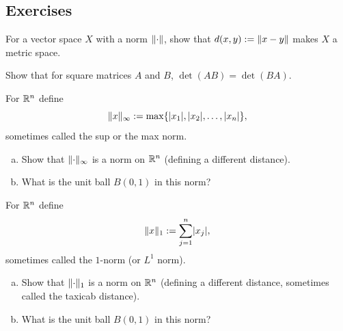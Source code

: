 \subsection{Exercises}

\begin{exercise}
For a vector space $X$ with a norm $\lVert {\cdot} \rVert$, show that
$d(x,y) := \lVert {x-y} \rVert$ makes $X$ a metric space.
\end{exercise}

\begin{exercise}[Easy]
Show that for square matrices $A$ and $B$, $\det(AB) = \det(BA)$.
\end{exercise}

\begin{exercise}
For ${\mathbb{R}}^n$ define
\begin{equation*}
\lVert {x} \rVert_{\infty} := \max \{ \lvert {x_1} \rvert, \lvert {x_2} \rvert, \ldots, \lvert {x_n} \rvert \} ,
\end{equation*}
sometimes called the sup or the max norm.
\begin{enumerate}[a)]
\item
Show that $\lVert {\cdot} \rVert_\infty$ is a norm on ${\mathbb{R}}^n$ (defining a different
distance).
\item
What is the unit ball $B(0,1)$ in this norm?
\end{enumerate}
\end{exercise}

\begin{samepage}
\begin{exercise}
For ${\mathbb{R}}^n$ define
\begin{equation*}
\lVert {x} \rVert_{1} := \sum_{j=1}^n \lvert {x_j} \rvert,
\end{equation*}
sometimes called the $1$-norm (or $L^1$ norm).
\begin{enumerate}[a)]
\item
Show that $\lVert {\cdot} \rVert_1$ is a norm on ${\mathbb{R}}^n$ (defining a different
distance, sometimes called the taxicab distance).
\item
What is the unit ball $B(0,1)$ in this norm?
\end{enumerate}
\end{exercise}
\end{samepage}

